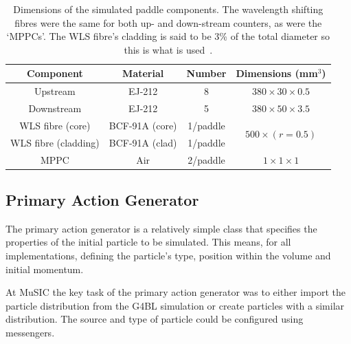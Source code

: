 \begin{table}
  \begin{center}
  \begin{tabular}{c | c | c | c}
    Component      & Material         & Number     &  Dimensions (mm\(^3\)) \\
    \hline
    Upstream              &  EJ-212          &  8         &  \(380\times30\times0.5 \) \\
    Downstream            &  EJ-212          &  5         &  \(380\times50\times3.5 \) \\
    WLS fibre (core)      &  BCF-91A (core)  &  1/paddle  &  
                                        \multirow{2}{*}{\(500\times(r=0.5)\)} \\
    WLS fibre (cladding)  &  BCF-91A (clad)  &  1/paddle  &  \\
    MPPC                  &  Air             &  2/paddle  &  \(1\times1\times1 \) \\
  \end{tabular}
  \end{center}
  \caption{Dimensions of the simulated paddle components. The wavelength shifting fibres were the same for both up- and down-stream counters, as were the `MPPCs'. The WLS fibre's cladding is said to be 3\% of the total diameter so this is what is used~\cite{bcf_91a}.}
  \label{tab:dimensions_of_paddles}
\end{table}

\subsection{Primary Action Generator} %
\label{sec:primary_action_generator}
The primary action generator is a relatively simple class that specifies the properties of the initial particle to be simulated. This means, for all implementations, defining the particle's type, position within the volume and initial momentum. 

At MuSIC the key task of the primary action generator was to either import the particle distribution from the G4BL simulation or create particles with a similar distribution. The source and type of particle could be configured using messengers.


